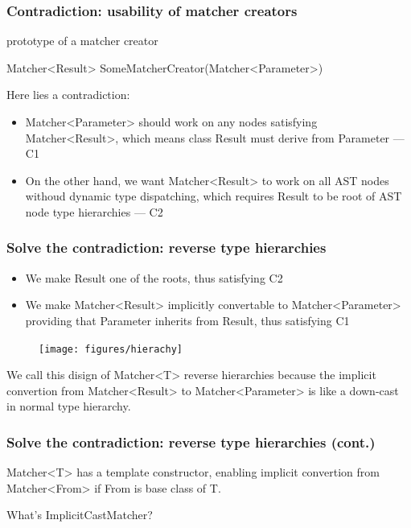 \documentclass[]{beamer}
\begin{document}
\begin{frame}
  \frametitle{Contradiction: usability of matcher creators}
  \begin{block}{prototype of a matcher creator}
    \centerline{Matcher<Result> SomeMatcherCreator(Matcher<Parameter>)}
  \end{block}
  \pause\vspace{1em}
  Here lies a contradiction:
  \begin{itemize}
    \item Matcher<Parameter> should work on any nodes satisfying
      Matcher<Result>, which means class Result must derive from
      Parameter \hfill \alert{--- C1}
    \item On the other hand, we want Matcher<Result> to work on all
      AST nodes withoud dynamic type dispatching, which requires
      Result to be root of AST node type hierarchies
      \hfill \alert{--- C2}
  \end{itemize}
\end{frame}

\begin{frame}
  \frametitle{Solve the contradiction: reverse type hierarchies}
  \begin{itemize}
    \item We make Result one of the roots, thus satisfying \alert{C2}
    \item We make Matcher<Result> implicitly convertable
    to Matcher<Parameter> providing that Parameter inherits from Result,
    thus satisfying \alert{C1}
  \end{itemize}
  \begin{figure}
    \texttt{[image: figures/hierachy]}
  \end{figure}
  \pause
  We call this disign of Matcher<T> \alert{reverse hierarchies} because
  the implicit convertion from Matcher<Result> to Matcher<Parameter> is
  like a down-cast in normal type hierarchy.
\end{frame}

\begin{frame}
  \frametitle{Solve the contradiction: reverse type hierarchies (cont.)}
  
  \pause
  Matcher<T> has a template constructor, enabling implicit convertion
  from Matcher<From> if From is base class of T.

  \pause\vspace{1em}
  \alert{What's ImplicitCastMatcher?}
\end{frame}
\end{document}
